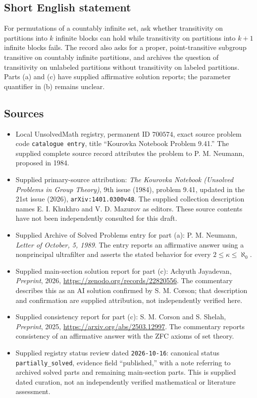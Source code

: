 \documentclass[11pt]{article}
\begin{document}
\subsection{Short English statement}
For permutations of a countably infinite set, ask whether transitivity on partitions into \(k\) infinite blocks can hold while transitivity on partitions into \(k+1\) infinite blocks fails. The record also asks for a proper, point-transitive subgroup transitive on countably infinite partitions, and archives the question of transitivity on unlabeled partitions without transitivity on labeled partitions. Parts (a) and (c) have supplied affirmative solution reports; the parameter quantifier in (b) remains unclear.
\subsection{Sources}
\begin{itemize}
\item Local UnsolvedMath registry, permanent ID \(700574\), exact source problem code \texttt{catalogue entry}, title ``Kourovka Notebook Problem 9.41.'' The supplied complete source record attributes the problem to P. M. Neumann, proposed in 1984.
\item Supplied primary-source attribution: \emph{The Kourovka Notebook (Unsolved Problems in Group Theory)}, 9th issue (1984), problem 9.41, updated in the 21st issue (2026), \texttt{arXiv:1401.0300v48}. The supplied collection description names E. I. Khukhro and V. D. Mazurov as editors. These source contents have not been independently consulted for this draft.
\item Supplied Archive of Solved Problems entry for part (a): P. M. Neumann, \emph{Letter of October, 5, 1989}. The entry reports an affirmative answer using a nonprincipal ultrafilter and asserts the stated behavior for every \(2\leq\kappa\leq\aleph_0\).
\item Supplied main-section solution report for part (c): Achyuth Jayadevan, \emph{Preprint}, 2026, \url{https://zenodo.org/records/22820556}. The commentary describes this as an AI solution confirmed by S. M. Corson; that description and confirmation are supplied attribution, not independently verified here.
\item Supplied consistency report for part (c): S. M. Corson and S. Shelah, \emph{Preprint}, 2025, \url{https://arxiv.org/abs/2503.12997}. The commentary reports consistency of an affirmative answer with the ZFC axioms of set theory.
\item Supplied registry status review dated \texttt{2026-10-16}: canonical status \texttt{partially\_solved}, evidence field ``published,'' with a note referring to archived solved parts and remaining main-section parts. This is supplied dated curation, not an independently verified mathematical or literature assessment.
\end{itemize}
\end{document}
